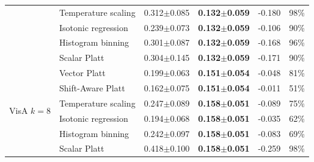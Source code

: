 \begin{table}[pos=t]
\begin{tabular}{llrrrr}
 & Temperature scaling & 0.312$\pm$0.085 & \textbf{0.132$\pm$0.059} & -0.180 & 98\% \\
 & Isotonic regression & 0.239$\pm$0.073 & \textbf{0.132$\pm$0.059} & -0.106 & 90\% \\
 & Histogram binning & 0.301$\pm$0.087 & \textbf{0.132$\pm$0.059} & -0.168 & 96\% \\
 & Scalar Platt & 0.304$\pm$0.145 & \textbf{0.132$\pm$0.059} & -0.171 & 90\% \\
\midrule
\multirow{6}{*}{VisA $k{=}8$} & Vector Platt & 0.199$\pm$0.063 & \textbf{0.151$\pm$0.054} & -0.048 & 81\% \\
 & Shift-Aware Platt & 0.162$\pm$0.075 & \textbf{0.151$\pm$0.054} & -0.011 & 51\% \\
 & Temperature scaling & 0.247$\pm$0.089 & \textbf{0.158$\pm$0.051} & -0.089 & 75\% \\
 & Isotonic regression & 0.194$\pm$0.068 & \textbf{0.158$\pm$0.051} & -0.035 & 62\% \\
 & Histogram binning & 0.242$\pm$0.097 & \textbf{0.158$\pm$0.051} & -0.083 & 69\% \\
 & Scalar Platt & 0.418$\pm$0.100 & \textbf{0.158$\pm$0.051} & -0.259 & 98\% \\
\bottomrule
\end{tabular}
\end{table}

